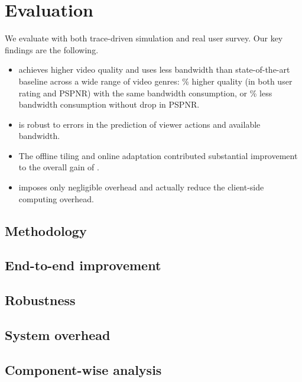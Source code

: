 
\section{Evaluation}
\label{sec:eval}

We evaluate \name with both trace-driven simulation and real user survey. 
Our key findings are the following.

\begin{itemize}

\item \name achieves higher video quality and uses less bandwidth than state-of-the-art baseline across a wide range of video genres: \fillme\% higher quality (in both user rating and PSPNR) with the same bandwidth consumption, or \fillme\% less bandwidth consumption without drop in PSPNR.

\item \name is robust to errors in the prediction of viewer actions and available bandwidth. 

\item The offline tiling and online adaptation contributed substantial improvement to the overall gain of \name.

\item \name imposes only negligible overhead and actually reduce the client-side computing overhead.

\end{itemize}

\subsection{Methodology}





\subsection{End-to-end improvement}




\subsection{Robustness}




\subsection{System overhead}




\subsection{Component-wise analysis}


